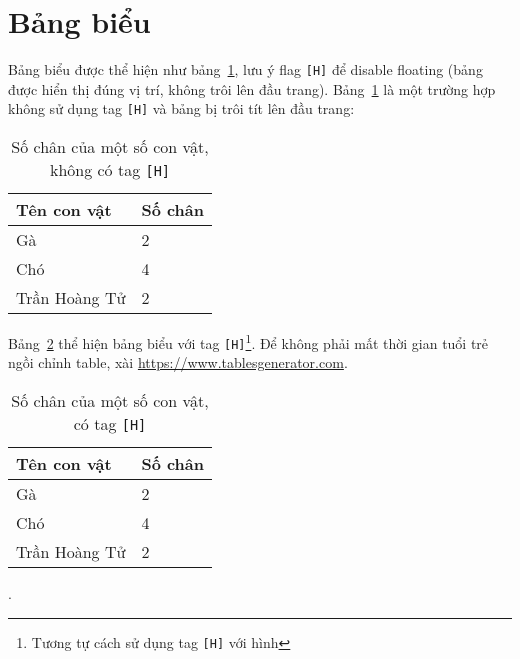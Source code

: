 \section{Bảng biểu}
Bảng biểu được thể hiện như bảng~\ref{tab:my_label}, lưu ý flag \texttt{[H]} để disable floating (bảng được hiển thị đúng vị trí, không trôi lên đầu trang). Bảng~\ref{tab:my_label} là một trường hợp không sử dụng tag \texttt{[H]} và bảng bị trôi tít lên đầu trang:
\begin{table}%
\centering
\begin{tabular}{|l|l|}
\hline
\textbf{Tên con vật} & \textbf{Số chân} \\ \hline
Gà & 2 \\ \hline
Chó & 4 \\ \hline
Trần Hoàng Tử & 2 \\ \hline
\end{tabular}
\caption{Số chân của một số con vật, không có tag \texttt{[H]}}
\label{tab:my_label}
\end{table}

Bảng~\ref{tab:my_label_with_H_tag} thể hiện bảng biểu với tag \texttt{[H]}\footnote{Tương tự cách sử dụng tag \texttt{[H]} với hình}. Để không phải mất thời gian tuổi trẻ ngồi chỉnh table, xài \href{https://www.tablesgenerator.com}{https://www.tablesgenerator.com}.

\begin{table}[H]
\centering
\begin{tabular}{|l|l|}
\hline
\textbf{Tên con vật} & \textbf{Số chân} \\ \hline
Gà & 2 \\ \hline
Chó & 4 \\ \hline
Trần Hoàng Tử & 2 \\ \hline
\end{tabular}
\caption{Số chân của một số con vật, có tag \texttt{[H]}}
\label{tab:my_label_with_H_tag}
\end{table}.